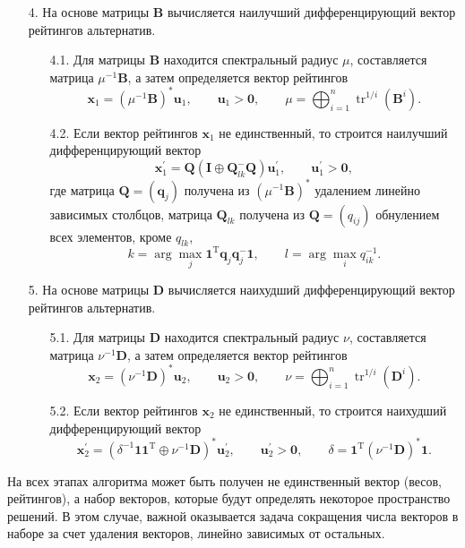 \documentclass{spisok-article}
\begin{document}
\begin{itemize}
        
        \item[4.]
На основе матрицы $\bm{B}$ вычисляется наилучший дифференцирующий вектор рейтингов альтернатив.
\begin{itemize}
\item[4.1.]
Для матрицы $\bm{B}$ находится спектральный радиус $\mu$, составляется матрица $\mu^{-1}\bm{B}$, а затем определяется вектор рейтингов
$$
\bm{x}_{1}
=
(\mu^{-1}\bm{B})^{\ast}\bm{u}_{1},
\qquad
\bm{u}_{1}
>
\bm{0},
\qquad
\mu
=
\bigoplus_{i=1}^{n}{\mathop\mathrm{tr}}^{1/i}(\bm{B}^{i}).
$$
\item[4.2.]
Если вектор рейтингов $\bm{x}_{1}$ не единственный, то строится наилучший дифференцирующий вектор
$$
\bm{x}_{1}^{\prime}
=
\bm{Q}(\bm{I}\oplus\bm{Q}_{lk}^{-}\bm{Q})
\bm{u}_{1}^{\prime},
\qquad
\bm{u}_{1}^{\prime}
>
\bm{0},
$$
где матрица $\bm{Q}=(\bm{q}_{j})$ получена из $(\mu^{-1}\bm{B})^{\ast}$ удалением линейно зависимых столбцов, матрица $\bm{Q}_{lk}$ получена из $\bm{Q}=(q_{ij})$ обнулением всех элементов, кроме $q_{lk}$, 
$$
k
=
\arg\max_{j}\bm{1}^{\mathrm{T}}\bm{q}_{j}\bm{q}_{j}^{-}\bm{1},
\qquad
l
=
\arg\max_{i}q_{ik}^{-1}.
$$
\end{itemize}
\item[5.]
На основе матрицы $\bm{D}$ вычисляется наихудший дифференцирующий вектор рейтингов альтернатив.
\begin{itemize}
\item[5.1.]
Для матрицы $\bm{D}$ находится спектральный радиус $\nu$, составляется матрица $\nu^{-1}\bm{D}$, а затем определяется вектор рейтингов
$$
\bm{x}_{2}
=
(\nu^{-1}\bm{D})^{\ast}\bm{u}_{2},
\qquad
\bm{u}_{2}
>
\bm{0},
\qquad
\nu
=
\bigoplus_{i=1}^{n}{\mathop\mathrm{tr}}^{1/i}(\bm{D}^{i}).
$$
\item[5.2.]
Если вектор рейтингов $\bm{x}_{2}$ не единственный, то строится наихудший дифференцирующий вектор
$$
\bm{x}_{2}^{\prime}
=
(\delta^{-1}\bm{1}\bm{1}^{\mathrm{T}}\oplus\nu^{-1}\bm{D})^{\ast}
\bm{u}_{2}^{\prime},
\qquad
\bm{u}_{2}^{\prime}
>
\bm{0},
\qquad
\delta
=
\bm{1}^{\mathrm{T}}(\nu^{-1}\bm{D})^{\ast}\bm{1}.
$$
        \end{itemize}
        
        \end{itemize}

    На всех этапах алгоритма может быть получен не единственный вектор (весов, рейтингов), а набор векторов, которые будут определять некоторое пространство решений. В этом случае, важной оказывается задача сокращения числа векторов в наборе за счет удаления векторов, линейно зависимых от остальных.
\end{document}
